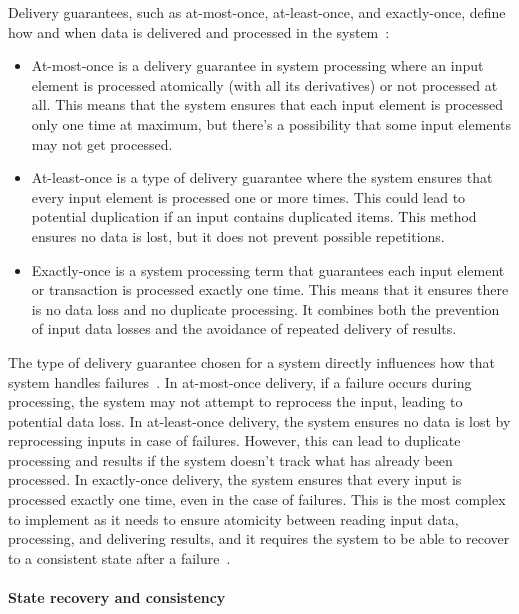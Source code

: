 Delivery guarantees, such as at-most-once, at-least-once, and exactly-once, define how and when data is delivered and processed in the system~\cite{fragkoulis2024survey, carbone2018scalable, Akidau:2013:MFS:2536222.2536229}:
\begin{itemize}
    \item At-most-once is a delivery guarantee in system processing where an input element is processed atomically (with all its derivatives) or not processed at all. This means that the system ensures that each input element is processed only one time at maximum, but there's a possibility that some input elements may not get processed.
    \item At-least-once is a type of delivery guarantee where the system ensures that every input element is processed one or more times. This could lead to potential duplication if an input contains duplicated items. This method ensures no data is lost, but it does not prevent possible repetitions.
    \item Exactly-once is a system processing term that guarantees each input element or transaction is processed exactly one time. This means that it ensures there is no data loss and no duplicate processing. It combines both the prevention of input data losses and the avoidance of repeated delivery of results.
\end{itemize}

The type of delivery guarantee chosen for a system directly influences how that system handles failures~\cite{zhang2024survey, silvestre2021clonos, wang2021consistency}. In at-most-once delivery, if a failure occurs during processing, the system may not attempt to reprocess the input, leading to potential data loss. In at-least-once delivery, the system ensures no data is lost by reprocessing inputs in case of failures. However, this can lead to duplicate processing and results if the system doesn't track what has already been processed. In exactly-once delivery, the system ensures that every input is processed exactly one time, even in the case of failures. This is the most complex to implement as it needs to ensure atomicity between reading input data, processing, and delivering results, and it requires the system to be able to recover to a consistent state after a failure~\cite{Carbone:2017:SMA:3137765.3137777}.

\paragraph{State recovery and consistency}\mbox{} \\

